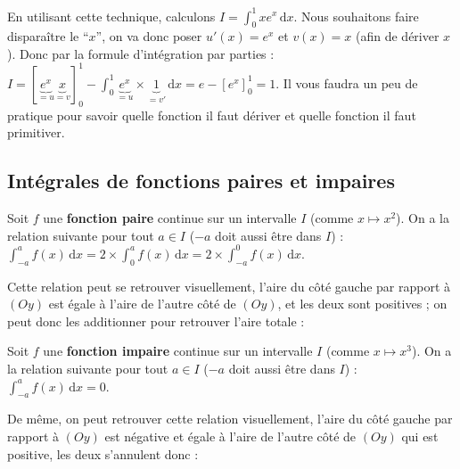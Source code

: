 	\begin{tip}[Exemple]
		En utilisant cette technique, calculons $\displaystyle{I = \int_{0}^1 xe^x \, \mathrm{d}x}$. Nous souhaitons faire disparaître le ``$x$'', on va donc poser $u'(x) = e^x$ et $v(x) = x$ (afin de dériver $x$).
		\newpar
		Donc par la formule d'intégration par parties :
		\newpar
		$\displaystyle{I = \left[\underbrace{e^x}_{= u} \underbrace{x}_{= v}\right]_0^1 - \int_{0}^1 \underbrace{e^x}_{= u} \times \underbrace{1}_{= v'} \, \mathrm{d}x = e - \left[ e^x \right]_0^1 = 1}$.
		\newpar
		Il vous faudra un peu de pratique pour savoir quelle fonction il faut dériver et quelle fonction il faut primitiver.
	\end{tip}

	\subsection{Intégrales de fonctions paires et impaires}
	\label{integrales-paires-impaires}

	\begin{formula}
		Soit $f$ une \textbf{fonction paire} continue sur un intervalle $I$ (comme $x \mapsto x^2$).
		\newpar
		On a la relation suivante pour tout $a \in I$ ($-a$ doit aussi être dans $I$) :
		\newpar
		$\displaystyle{\int_{-a}^{a} f(x) \, \mathrm{d}x = 2 \times \int_{0}^{a} f(x) \, \mathrm{d}x = 2 \times \int_{-a}^{0} f(x) \, \mathrm{d}x}$.
	\end{formula}

	\begin{tip}[Exemple]
		Cette relation peut se retrouver visuellement, l'aire du côté gauche par rapport à $(Oy)$ est égale à l'aire de l'autre côté de $(Oy)$, et les deux sont positives ; on peut donc les additionner pour retrouver l'aire totale :
	\end{tip}

	\begin{formula}
		Soit $f$ une \textbf{fonction impaire} continue sur un intervalle $I$ (comme $x \mapsto x^3$).
		\newpar
		On a la relation suivante pour tout $a \in I$ ($-a$ doit aussi être dans $I$) :
		\newpar
		$\displaystyle{\int_{-a}^{a} f(x) \, \mathrm{d}x = 0}$.
	\end{formula}

	\begin{tip}[Exemple]
		De même, on peut retrouver cette relation visuellement, l'aire du côté gauche par rapport à $(Oy)$ est négative et égale à l'aire de l'autre côté de $(Oy)$ qui est positive, les deux s'annulent donc :
	\end{tip}

